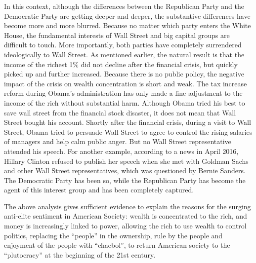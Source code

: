 \documentclass[11pt]{article}
\begin{document}
In this context, although the differences between the Republican Party and the Democratic Party are getting deeper and deeper, the substantive differences have become more and more blurred. Because no matter which party enters the White House, the fundamental interests of Wall Street and big capital groups are difficult to touch. More importantly, both parties have completely surrendered ideologically to Wall Street. As mentioned earlier, the natural result is that the income of the richest 1\% did not decline after the financial crisis, but quickly picked up and further increased. Because there is no public policy, the negative impact of the crisis on wealth concentration is short and weak. The tax increase reform during Obama's administration has only made a fine adjustment to the income of the rich without substantial harm. Although Obama tried his best to save wall street from the financial stock disaster, it does not mean that Wall Street bought his account. Shortly after the financial crisis, during a visit to Wall Street, Obama tried to persuade Wall Street to agree to control the rising salaries of managers and help calm public anger. But no Wall Street representative attended his speech. For another example, according to a news in April 2016, Hillary Clinton refused to publish her speech when she met with Goldman Sachs and other Wall Street representatives, which was questioned by Bernie Sanders. The Democratic Party has been so, while the Republican Party has become the agent of this interest group and has been completely captured.

The above analysis gives sufficient evidence to explain the reasons for the surging anti-elite sentiment in American Society: wealth is concentrated to the rich, and money is increasingly linked to power, allowing the rich to use wealth to control politics, replacing the “people” in the ownership, rule by the people and enjoyment of the people with “chaebol”, to return American society to the “plutocracy” at the beginning of the 21st century.
\end{document}
